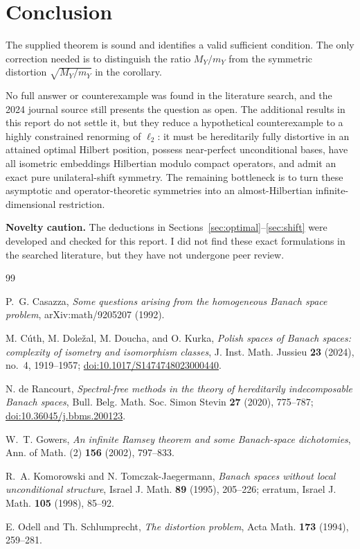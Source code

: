 \documentclass[11pt]{article}
\theoremstyle{definition}
\begin{document}
\section{Conclusion}

The supplied theorem is sound and identifies a valid sufficient condition.
The only correction needed is to distinguish the ratio $M_Y/m_Y$ from the
symmetric distortion $\sqrt{M_Y/m_Y}$ in the corollary.

No full answer or counterexample was found in the literature search, and the
2024 journal source still presents the question as open.  The additional
results in this report do not settle it, but they reduce a hypothetical
counterexample to a highly constrained renorming of $\ell_2$: it must be
hereditarily fully distortive in an attained optimal Hilbert position, possess
near-perfect unconditional bases, have all isometric embeddings Hilbertian
modulo compact operators, and admit an exact pure unilateral-shift symmetry.
The remaining bottleneck is to turn these asymptotic and operator-theoretic
symmetries into an almost-Hilbertian infinite-dimensional restriction.

\medskip
\noindent\textbf{Novelty caution.}  The deductions in
Sections~\ref{sec:optimal}--\ref{sec:shift} were developed and checked for this
report.  I did not find these exact formulations in the searched literature,
but they have not undergone peer review.

\begin{thebibliography}{99}

P.~G. Casazza,
\emph{Some questions arising from the homogeneous Banach space problem},
arXiv:math/9205207 (1992).

M. C\'uth, M. Dole\v{z}al, M. Doucha, and O. Kurka,
\emph{Polish spaces of Banach spaces: complexity of isometry and isomorphism
classes},
J. Inst. Math. Jussieu \textbf{23} (2024), no.~4, 1919--1957;
\href{https://doi.org/10.1017/S1474748023000440}{doi:10.1017/S1474748023000440}.

N. de Rancourt,
\emph{Spectral-free methods in the theory of hereditarily indecomposable
Banach spaces},
Bull. Belg. Math. Soc. Simon Stevin \textbf{27} (2020), 775--787;
\href{https://doi.org/10.36045/j.bbms.200123}{doi:10.36045/j.bbms.200123}.

W.~T. Gowers,
\emph{An infinite Ramsey theorem and some Banach-space dichotomies},
Ann. of Math. (2) \textbf{156} (2002), 797--833.

R.~A. Komorowski and N. Tomczak-Jaegermann,
\emph{Banach spaces without local unconditional structure},
Israel J. Math. \textbf{89} (1995), 205--226;
erratum, Israel J. Math. \textbf{105} (1998), 85--92.

E. Odell and Th. Schlumprecht,
\emph{The distortion problem},
Acta Math. \textbf{173} (1994), 259--281.

\end{thebibliography}
\end{document}
